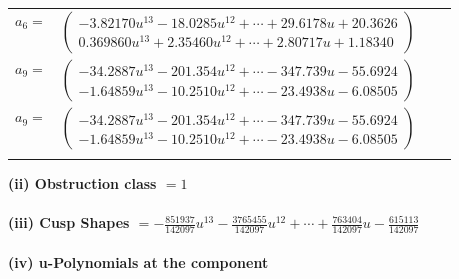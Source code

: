 \documentclass[1p]{elsarticle_modified}
\theoremstyle{definition}
\begin{document}
\begin{tabular}{m{7pt} m{180pt} m{7pt} m{180pt} }
\flushright $a_{6}=$&$\begin{pmatrix}-3.82170 u^{13}-18.0285 u^{12}+\cdots+29.6178 u+20.3626\\0.369860 u^{13}+2.35460 u^{12}+\cdots+2.80717 u+1.18340\end{pmatrix}$ \\
\flushright $a_{9}=$&$\begin{pmatrix}-34.2887 u^{13}-201.354 u^{12}+\cdots-347.739 u-55.6924\\-1.64859 u^{13}-10.2510 u^{12}+\cdots-23.4938 u-6.08505\end{pmatrix}$\\ \flushright $a_{9}=$&$\begin{pmatrix}-34.2887 u^{13}-201.354 u^{12}+\cdots-347.739 u-55.6924\\-1.64859 u^{13}-10.2510 u^{12}+\cdots-23.4938 u-6.08505\end{pmatrix}$\\&\end{tabular}
\flushleft \textbf{(ii) Obstruction class $= 1$}\\~\\
\flushleft \textbf{(iii) Cusp Shapes $= -\frac{851937}{142097} u^{13}-\frac{3765455}{142097} u^{12}+\cdots+\frac{763404}{142097} u-\frac{615113}{142097}$}\\~\\
\newpage\renewcommand{\arraystretch}{1}
\flushleft \textbf{(iv) u-Polynomials at the component}\newline \\
\end{document}
